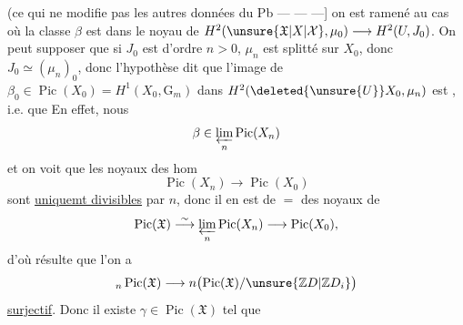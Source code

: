 (ce qui ne modifie pas les autres données
du Pb \enspace--- --- ---] on est ramené au
cas où la classe $\beta$ est dans le
noyau de $H^2(\unsure{\mathfrak X|X|\mathcal X},\mu_0)\longrightarrow H^2(U,J_0)$. On peut
supposer  que si $J_0$ est d'ordre $n>0$,
$\mu_n$ est splitté sur $X_0$, donc $J_0\simeq(\mu_n)_0$, donc
l'hypothèse dit que l'image de \deleted{\unsure{$\beta$}}
$\beta_0\in\operatorname{Pic}(X_0)=H^1(X_0,\mathrm G_m)$ dans
$H^2(\deleted{\unsure{U}}X_0,\mu_n)$ est
, i.e. que 
 En effet, nous 
\[
\beta\in\varprojlim_n\operatorname{Pic}(X_n)
\]
et on voit que les noyaux des hom
\[
\operatorname{Pic}(X_n)\longrightarrow\operatorname{Pic}(X_0)
\]
sont  \uline{uniquemt divisibles} par $n$, donc
il en est de $=$ des noyaux de
\[
\operatorname{Pic}(\mathfrak X)\overset{\sim}{\longrightarrow}
\varprojlim_n\operatorname{Pic}(X_n)\longrightarrow\operatorname{Pic}(X_0),
\]
d'où résulte que l'on a
\[
{}_n\operatorname{Pic}(\mathfrak X)\longrightarrow
n\bigl(\operatorname{Pic}(\mathfrak X)/\unsure{\mathbb Z D|{\mathbb Z}D_i}\bigr)
\]
\uline{surjectif}. Donc il existe $\gamma\in\operatorname{Pic}(\mathfrak X)$ tel que
\inserted{$\beta\in\operatorname{Pic}(\mathfrak X)$ défini par $X_0$ de $\mathfrak X$]}
